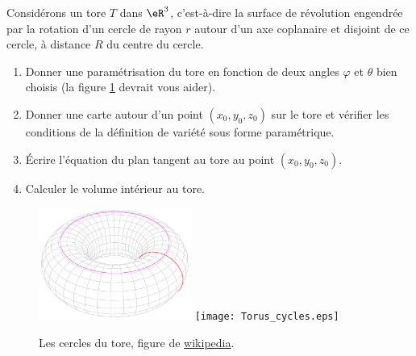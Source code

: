 
\begin{exercice}\label{exoTP20090003}


Considérons un tore $T$ dans $\eR^3$, c’est-à-dire la surface de révolution engendrée par la rotation d’un cercle de rayon $r$ autour d’un axe coplanaire et disjoint de ce cercle, à distance $R$ du centre du cercle.
\begin{enumerate}

	\item
		Donner une paramétrisation du tore en fonction de deux angles $\varphi$ et $\theta$ bien choisis (la figure \ref{FigToreWiki} devrait vous aider).
	\item
		Donner une carte autour d’un point $(x_0 , y_0 , z_0 )$ sur le tore et vérifier les conditions de la définition de variété sous forme paramétrique.
	\item
		Écrire l'équation du plan tangent au tore au point $(x_0 , y_0 , z_0 )$.
	\item
		Calculer le volume intérieur au tore.

\end{enumerate}

\begin{figure}
    \ifpdf
	\includegraphics[width=5cm]{Torus_cycles.png}
    \else
	\texttt{[image: Torus\_cycles.eps]}
    \fi
	\caption{Les cercles du tore, figure de \href{http://fr.wikipedia.org/wiki/Tore}{wikipedia}.}\label{FigToreWiki}
\end{figure}

\end{exercice}
